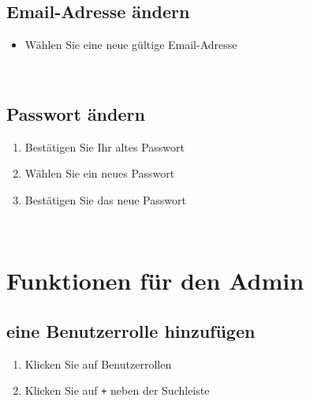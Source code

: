 \documentclass[11pt,a4paper]{report}
\begin{document}
	\subsection{Email-Adresse ändern}
		\begin{itemize}
		\item Wählen Sie eine neue gültige Email-Adresse
	\end{itemize}\\

	\subsection{Passwort ändern}
	\begin{enumerate}
		\item Bestätigen Sie Ihr altes Passwort
		\item Wählen Sie ein neues Passwort
		\item Bestätigen Sie das neue Passwort
	\end{enumerate}\\

	\section{Funktionen für den Admin}
	\subsection{eine Benutzerrolle hinzufügen}

	\begin{enumerate}
		\item Klicken Sie auf \glqq{}Benutzerrollen\grqq{}
		\item Klicken Sie auf \texttt{+} neben der Suchleiste
	\end{enumerate}\\
\end{document}
